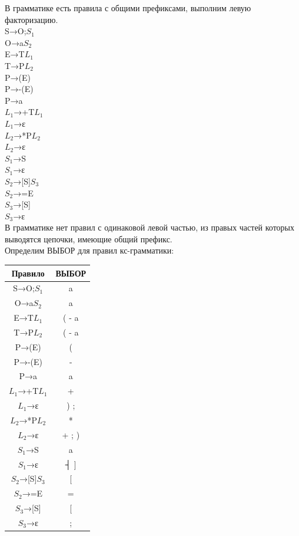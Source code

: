 \documentclass[a4paper,14pt]{extarticle}
\begin{document}
\begin{enumerate}[1.]
    В грамматике есть правила с общими префиксами, выполним левую факторизацию.\\
    S→O;$S_1$\\
    O→a$S_2$\\
    E→T$L_1$\\
    T→P$L_2$\\
    P→(E)\\
    P→-(E)\\
    P→a\\
    $L_1$→+T$L_1$\\
    $L_1$→ε\\
    $L_2$→*P$L_2$\\
    $L_2$→ε\\
    $S_1$→S\\
    $S_1$→ε\\
    $S_2$→[S]$S_3$\\
    $S_2$→=E\\
    $S_3$→[S]\\
    $S_3$→ε\\

    В грамматике нет правил с одинаковой левой частью, из правых частей которых выводятся цепочки, имеющие общий префикс.\\

    Определим ВЫБОР для правил кс-грамматики:\\
    \begin{tabular}{|c|c|}
    \hline
    Правило        & ВЫБОР\\
    \hline
    S→O;$S_1$      & a     \\
    \hline
    O→a$S_2$       & a     \\
    \hline
    E→T$L_1$       & ( - a \\
    \hline
    T→P$L_2$       & ( - a \\
    \hline
    P→(E)          & (     \\
    \hline
    P→-(E)         & -     \\
    \hline
    P→a            & a     \\
    \hline
    $L_1$→+T$L_1$  & +     \\
    \hline
    $L_1$→ε        & ) ;   \\
    \hline
    $L_2$→*P$L_2$  & *     \\
    \hline
    $L_2$→ε        & + ; ) \\
    \hline
    $S_1$→S        & a     \\
    \hline
    $S_1$→ε        & ┤ ]   \\
    \hline
    $S_2$→[S]$S_3$ & [     \\
    \hline
    $S_2$→=E       & =     \\
    \hline
    $S_3$→[S]      & [     \\
    \hline
    $S_3$→ε        & ;     \\
    \hline
    \end{tabular}\\


\end{enumerate}
\end{document}
